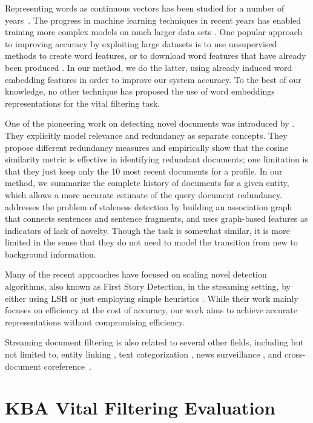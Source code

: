 \documentclass{article}
\begin{document}
Representing words as continuous vectors has been studied for a number of years~\cite{Hinton87, Elman90findingstructure}. 
The progress in machine learning techniques in recent years has enabled training more complex models on much larger data sets \cite{mikolovChen}. 
One popular approach to improving accuracy by exploiting large datasets is to use unsupervised methods to create word features, or to download word features that have already been produced \cite{Turian10wordrepresentations}. In our method, we do the latter, using already induced word embedding features in order to improve our system accuracy. To the best of our knowledge, no other technique has proposed the use of word embeddings representations for the vital filtering task.

One of the pioneering work on detecting novel documents was introduced by \citet{Zhang2002}. They explicitly model relevance and redundancy as separate concepts. They propose different redundancy measures and empirically show that the cosine similarity metric is effective in identifying redundant documents; one limitation is that they just keep only the 10 most recent documents for a profile. In our method, we summarize the complete history of documents for a given entity, which allows a more accurate estimate of the query document redundancy.
\citet{gamon} addresses the problem of staleness detection by building an association graph that connects sentences and sentence fragments, and uses graph-based features as indicators of lack of novelty. Though the task is somewhat similar, it is more limited in the sense that they do not need to model the transition from new to background information. %

Many of the recent approaches have focused on scaling novel detection algorithms, also known as First Story Detection, in the streaming setting, by either using LSH \cite{Petrovic2010} or just employing simple heuristics \cite{Luo2007}. While their work mainly focuses on efficiency at the cost of accuracy, our work aims to achieve accurate representations without compromising efficiency. 

Streaming document filtering is also related to several other fields, including but not limited to, entity linking \cite{KBP11}, text categorization \cite{HLTCOE12}, news surveillance \cite{Steinberger14}, and cross-document coreference~\cite{RaoMD10,singh11:acl}.


\section{KBA Vital Filtering Evaluation}
\label{evaluation}
\end{document}
